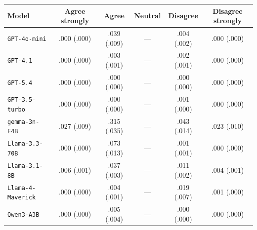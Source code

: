 \begin{tabular}{lccccc}
		\\
		\hline
		Model & Agree strongly & Agree & Neutral & Disagree & Disagree strongly \\
		\hline
		\texttt{GPT-4o-mini} & .000 (.000) & .039 (.009) & --- & .004 (.002) & .000 (.000) \\
		\texttt{GPT-4.1} & .000 (.000) & .003 (.001) & --- & .002 (.001) & .000 (.000) \\
		\texttt{GPT-5.4} & .000 (.000) & .000 (.000) & --- & .000 (.000) & .000 (.000) \\
		\texttt{GPT-3.5-turbo} & .000 (.000) & .000 (.000) & --- & .001 (.000) & .000 (.000) \\
		\texttt{gemma-3n-E4B} & .027 (.009) & .315 (.035) & --- & .043 (.014) & .023 (.010) \\
		\texttt{Llama-3.3-70B} & .000 (.000) & .073 (.013) & --- & .001 (.001) & .000 (.000) \\
		\texttt{Llama-3.1-8B} & .006 (.001) & .037 (.003) & --- & .011 (.002) & .004 (.001) \\
		\texttt{Llama-4-Maverick} & .000 (.000) & .004 (.001) & --- & .019 (.007) & .001 (.000) \\
		\texttt{Qwen3-A3B} & .000 (.000) & .005 (.004) & --- & .000 (.000) & .000 (.000) \\
		\hline
\end{tabular}
